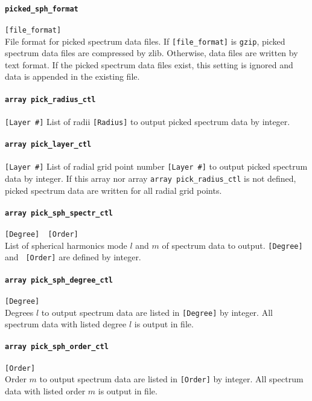 \paragraph{\tt picked\_sph\_format}
\label{href_t:picked_sph_format}
\verb|[file_format]| \\
File format for picked spectrum data files. If \verb|[file_format]| is \verb|gzip|, picked spectrum data files are compressed by zlib. Otherwise, data files are written by text format. If the picked spectrum data files exist, this setting is ignored and  data is appended in the existing file.

\paragraph{\tt array pick\_radius\_ctl}
\label{href_t:pick_radius_ctl}
\verb|[Layer #]|
List of radii \verb|[Radius]| to output picked spectrum data by integer.
\paragraph{\tt array pick\_layer\_ctl}
\label{href_t:pick_layer_ctl}
\verb|[Layer #]|
List of radial grid point number \verb|[Layer #]| to output picked spectrum data by integer. If this array nor array {\tt array pick\_radius\_ctl} is not defined, picked spectrum data are written for all radial grid points.

\paragraph{\tt array pick\_sph\_spectr\_ctl}
\label{href_t:pick_sph_spectr_ctl}
\verb|[Degree]  [Order]| \\
List of spherical harmonics mode $l$ and $m$ of spectrum data to output. \verb|[Degree]| and \verb| [Order]| are defined by integer.

\paragraph{\tt array pick\_sph\_degree\_ctl}
\label{href_t:pick_sph_degree_ctl}
\verb|[Degree]| \\
Degrees $l$ to output spectrum data are listed in \verb|[Degree]| by integer. All spectrum data with listed degree $l$ is output in file.

\paragraph{\tt array pick\_sph\_order\_ctl}
\label{href_t:pick_sph_order_ctl}
\verb|[Order]| \\
Order $m$ to output spectrum data are listed in \verb|[Order]| by integer. All spectrum data with listed order $m$ is output in file.

